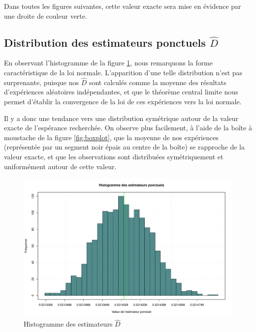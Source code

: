 \documentclass[paper=a4, fontsize=11pt]{scrartcl}
\begin{document}
Dans toutes les figures suivantes, cette valeur exacte sera mise en évidence par une droite de couleur verte.

\subsection{Distribution des estimateurs ponctuels $\widehat{D}$}

En observant l'histogramme de la figure \ref{fig:hist}, nous remarquons la forme caractéristique de la loi normale. L'apparition d'une telle distribution n'est pas surprenante, puisque nos $\widehat{D}$ sont calculés comme la moyenne des résultats d'expériences aléatoires indépendantes, et que le théorème central limite nous permet d'établir la convergence de la loi de ces expériences vers la loi normale.

Il y a donc une tendance vers une distribution symétrique autour de la valeur exacte de l'espérance recherchée. On observe plus facilement, à l'aide de la boîte à moustache de la figure \ref{fig:boxplot}, que la moyenne de nos expériences (représentée par un segment noir épais au centre de la boîte) se rapproche de la valeur exacte, et que les observations sont distribuées symétriquement et uniformément autour de cette valeur.

\begin{figure}[H]
  \centering
  \includegraphics[scale=0.5]{../analysis/plots/EstimatorHistogram.pdf}
  \caption{Histogramme des estimateurs $\widehat{D}$}
  \label{fig:hist}
\end{figure}
\end{document}

